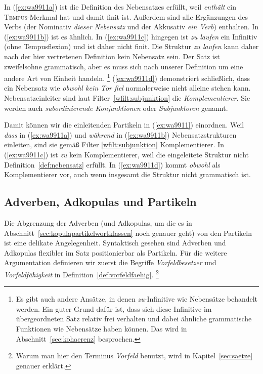 In (\ref{ex:wa9911a}) ist die Definition des Nebensatzes erfüllt, weil \textit{enthält} ein \textsc{Tempus}-Merkmal hat und damit finit ist.
Außerdem sind alle Ergänzungen des Verbs (der Nominativ \textit{dieser Nebensatz} und der Akkusativ \textit{ein Verb}) enthalten.
In (\ref{ex:wa9911b}) ist es ähnlich.
In (\ref{ex:wa9911c}) hingegen ist \textit{zu laufen} ein Infinitiv (ohne Tempusflexion) und ist daher nicht finit.
Die Struktur \textit{zu laufen} kann daher nach der hier vertretenen Definition kein Nebensatz sein.
Der Satz ist zweifelsohne grammatisch, aber es muss sich nach unserer Definition um eine andere Art von Einheit handeln.%
\footnote{Es gibt auch andere Ansätze, in denen \textit{zu}-Infinitive wie Nebensätze behandelt werden.
Ein guter Grund dafür ist, dass sich diese Infinitive im übergeordneten Satz relativ frei verhalten und dabei ähnliche grammatische Funktionen wie Nebensätze haben können.
Das wird in Abschnitt~\ref{sec:kohaerenz} besprochen.}
(\ref{ex:wa9911d}) demonstriert schließlich, dass ein Nebensatz wie \textit{obwohl kein Tor fiel} normalerweise nicht alleine stehen kann.
Nebensatzeinleiter sind laut Filter~\ref{wfilt:subjunktion} die \textit{Komplementierer}.
Sie werden auch \textit{subordinierende Konjunktionen} oder \textit{Subjunktoren} genannt.


Damit können wir die einleitenden Partikeln in (\ref{ex:wa9911}) einordnen.
Weil \textit{dass} in (\ref{ex:wa9911a}) und \textit{während} in (\ref{ex:wa9911b}) Nebensatzstrukturen einleiten, sind sie gemäß Filter \ref{wfilt:subjunktion} Komplementierer.
In (\ref{ex:wa9911c}) ist \textit{zu} kein Komplementierer, weil die eingeleitete Struktur nicht Definition~\ref{def:nebensatz} erfüllt.
In (\ref{ex:wa9911d}) kommt \textit{obwohl} als Komplementierer vor, auch wenn insgesamt die Struktur nicht grammatisch ist.

\subsection{Adverben, Adkopulas und Partikeln}

\label{sec:adverbenpartikelnwortklassen}


Die Abgrenzung der Adverben (und Adkopulas, um die es in Abschnitt~\ref{sec:kopulapartikelwortklassen} noch genauer geht) von den Partikeln ist eine delikate Angelegenheit.
Syntaktisch gesehen sind Adverben und Adkopulas flexibler im Satz positionierbar als Partikeln. 
Für die weitere Argumentation definieren wir zuerst die Begriffe \textit{Vorfeldbesetzer} und \textit{Vorfeldfähigkeit} in Definition~\ref{def:vorfeldfaehig}.%
\footnote{Warum man hier den Terminus \textit{Vorfeld} benutzt, wird in Kapitel~\ref{sec:saetze} genauer erklärt.}

